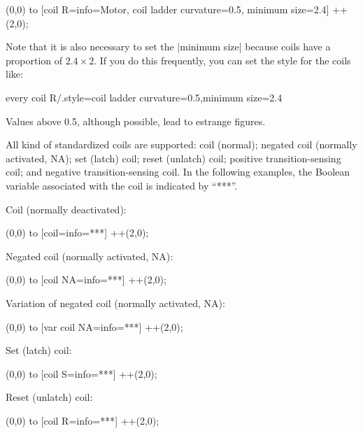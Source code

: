 \documentclass[a4paper]{ltxdoc}
\begin{document}
\begin{codeexample}[width=2.3cm]
  \draw(0,0) to [coil R={info={Motor},
     coil ladder curvature=0.5,
     minimum size=2.4\tikzcircuitssizeunit}] ++(2,0);
\end{codeexample}

Note that it is also necessary to set the |minimum size| because coils have a proportion of $2.4\times2$. If you do this frequently, you can set the style for the coils like:

\begin{codeexample}
every coil R/.style={coil ladder curvature=0.5,minimum size=2.4\tikzcircuitssizeunit}
\end{codeexample}

Values above 0.5, although possible, lead to estrange figures.

All kind of standardized coils are supported: coil (normal); negated coil (normally activated, NA); set (latch) coil; reset (unlatch) coil; positive transition-sensing coil; and negative transition-sensing coil. In the following examples, the Boolean variable associated with the coil is indicated by ``***''.

Coil (normally deactivated):
\begin{codeexample}[width=2.3cm]
  \draw(0,0) to [coil={info={***}}] ++(2,0);
\end{codeexample}

Negated coil (normally activated, NA):
\begin{codeexample}[width=2.3cm]
  \draw(0,0) to [coil NA={info={***}}] ++(2,0);
\end{codeexample}

Variation of negated coil (normally activated, NA):
\begin{codeexample}[width=2.3cm]
  \draw(0,0) to [var coil NA={info={***}}] ++(2,0);
\end{codeexample}

Set (latch) coil:
\begin{codeexample}[width=2.3cm]
  \draw(0,0) to [coil S={info={***}}] ++(2,0);
\end{codeexample}

Reset (unlatch) coil:
\begin{codeexample}[width=2.3cm]
  \draw(0,0) to [coil R={info={***}}] ++(2,0);
\end{codeexample}
\end{document}
